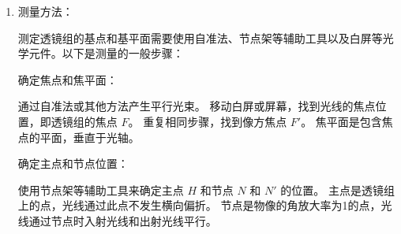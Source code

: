 \documentclass[dvipsnames, svgnames,a4paper,11pt]{article}
\begin{document}
\begin{enumerate}
		在此基础上，利用上述两个公式，结合原理图（\cref{fig:cite1}），有：
		
		第一次成像:
		
		\[\frac{1}{s_{1}}+\frac{1}{s_{1}^{'}}=\frac{1}{f_{L1}}\]
		
		第二次成像:
		
		\[\frac{1}{s_{2}}+\frac{1}{s_{2}^{'}}=\frac{1}{f_{L2}}\]
		
		两透镜间距:
		
		\[s_{2}+s_{1}^{'}=l\]
		
		横向放大率:
		
		\[\frac{s_{1}^{'}s_{2}^{'}}{s_{1}s_{1}}=1\]
		
		联立以上各式解得：
		
		\textbf{焦距理论值}
		
		\[f=\frac{f_{L1}f_{L2}}{f_{L1}+f_{L2}-l}\]
		
		\textbf{物方主点位置}
		
		\[X_{H}=-\frac{fl}{f_{L2}}\]
		
		\textbf{像方主点位置}
		
		\[X_{H^{'}}=-\frac{fl}{f_{L1}}\]
		
		\item 测量方法：
		
		测定透镜组的基点和基平面需要使用自准法、节点架等辅助工具以及白屏等光学元件。以下是测量的一般步骤：
		
		确定焦点和焦平面：
		
		通过自准法或其他方法产生平行光束。
		移动白屏或屏幕，找到光线的焦点位置，即透镜组的焦点 \(F\)。
		重复相同步骤，找到像方焦点 \(F'\)。
		焦平面是包含焦点的平面，垂直于光轴。
		
		确定主点和节点位置：
		
		使用节点架等辅助工具来确定主点 \(H\) 和节点 \(N\) 和 \(N'\) 的位置。
		主点是透镜组上的点，光线通过此点不发生横向偏折。
		节点是物像的角放大率为1的点，光线通过节点时入射光线和出射光线平行。
	\end{enumerate}
	
	\clearpage
\end{document}
